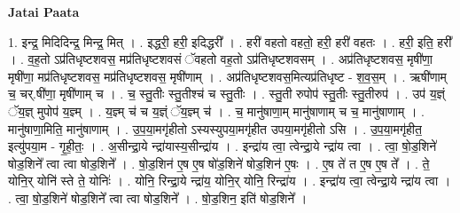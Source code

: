 \documentclass[17pt]{extarticle}
\begin{document}
\textbf{Jatai Paata} \newline

1. इन्द्र॒ मिदिदिन्द्र॒ मिन्द्र॒ मित् । . इद्धरी॒ हरी॒ इदिद्धरी᳚ । . हरी॑ वहतो वहतो॒ हरी॒ हरी॑ वहतः । . हरी॒ इति॒ हरी᳚ । . व॒ह॒तो ऽप्र॑तिधृष्टशवस॒ मप्र॑तिधृष्टशवसं ॅवहतो वह॒तो ऽप्र॑तिधृष्टशवसम् । . अप्र॑तिधृष्टशवस॒ मृषी॑णा॒ मृषी॑णा॒ मप्र॑तिधृष्टशवस॒ मप्र॑तिधृष्टशवस॒ मृषी॑णाम् । . अप्र॑तिधृष्टशवस॒मित्यप्र॑तिधृष्ट - श॒व॒स॒म् । . ऋषी॑णाम् च॒ चर्.षी॑णा॒ मृषी॑णाम् च । . च॒ स्तु॒तीः स्तु॒तीश्च॑ च स्तु॒तीः । . स्तु॒ती रुपोप॑ स्तु॒तीः स्तु॒तीरुप॑ । . उप॑ य॒ज्ञ्ं ॅय॒ज्ञ् मुपोप॑ य॒ज्ञ्म् । . य॒ज्ञ्म् च॑ च य॒ज्ञ्ं ॅय॒ज्ञ्म् च॑ । . च॒ मानु॑षाणा॒म् मानु॑षाणाम् च च॒ मानु॑षाणाम् । . मानु॑षाणा॒मिति॒ मानु॑षाणाम् । . उ॒प॒या॒मगृ॑हीतो ऽस्यस्युपया॒मगृ॑हीत उपया॒मगृ॑हीतो ऽसि । . उ॒प॒या॒मगृ॑हीत॒ इत्यु॑पया॒म - गृ॒ही॒तः॒ । . अ॒सीन्द्रा॒ये न्द्रा॑यास्य॒सीन्द्रा॑य । . इन्द्रा॑य त्वा॒ त्वेन्द्रा॒ये न्द्रा॑य त्वा । . त्वा॒ षो॒ड॒शिने॑ षोड॒शिने᳚ त्वा त्वा षोड॒शिने᳚ । . षो॒ड॒शिन॑ ए॒ष ए॒ष षो॑ड॒शिने॑ षोड॒शिन॑ ए॒षः । . ए॒ष ते॑ त ए॒ष ए॒ष ते᳚ । . ते॒ योनि॒र् योनि॑ स्ते ते॒ योनिः॑ । . योनि॒ रिन्द्रा॒ये न्द्रा॑य॒ योनि॒र् योनि॒ रिन्द्रा॑य । . इन्द्रा॑य त्वा॒ त्वेन्द्रा॒ये न्द्रा॑य त्वा । . त्वा॒ षो॒ड॒शिने॑ षोड॒शिने᳚ त्वा त्वा षोड॒शिने᳚ । . षो॒ड॒शिन॒ इति॑ षोड॒शिने᳚ । \newline
\end{document}
